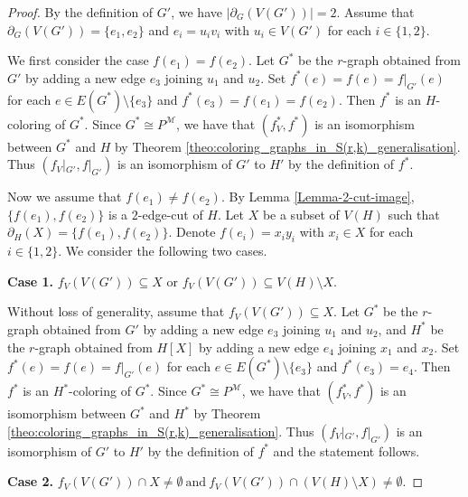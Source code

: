 \documentclass[a4paper,11pt]{article}
\newcommand{\ca}{\mathcal}
\theoremstyle{remark}
\begin{document}
\begin{proof}
	By the definition of $ G' $, we have $ | \partial_G(V(G')) |=2$. Assume that $\partial_G(V(G')) =\{e_1,e_2\}$ and $ e_i=u_iv_i $ with $ u_i\in V(G') $ for each $ i\in \{1,2\} $.
	
	We first consider the case $ f(e_1)=f(e_2) $. Let $ G^* $ be the $ r $-graph obtained from $ G' $ by adding a new edge $ e_3 $ joining $ u_1 $ and $ u_2 $. Set $ f^*(e)= f(e)=f|_{G'}(e) $ for each $ e\in E(G^*) \setminus \{e_3\}$ and $ f^*(e_3)= f(e_1)=f(e_2) $. Then $ f^* $ is an $ H $-coloring of $ G^* $. Since $ G^* \cong P^{\ca M}$, we have that $ (f^*_V,f^*) $ is an isomorphism between $ G^* $ and $ H$ by Theorem \ref{theo:coloring_graphs_in_S(r,k)_generalisation}. Thus $ (f_V|_{G'} , f|_{G'} ) $ is an isomorphism of $ G' $ to $ H' $ by the definition of $ f^* $.
	
	Now we assume that $ f(e_1)\neq f(e_2) $. By Lemma \ref{Lemma-2-cut-image}, $\{f(e_1), f(e_2) \}$  is a $ 2 $-edge-cut of $ H $. Let  $ X $ be a subset of $ V(H) $ such that $ \partial_H(X)=\{f(e_1), f(e_2) \}$. Denote $ f(e_i)=x_iy_i$ with $ x_i\in X $ for each $ i\in\{1,2\} $. We consider the following two cases.
	
	{\bf Case 1.} $f_V(V(G')) \subseteq X$ or $f_V(V(G'))\subseteq V(H)\setminus X$.
	
Without loss of generality, assume that  $f_V(V(G'))\subseteq X$. Let $ G^* $ be the $ r $-graph obtained from $ G' $ by adding a new edge $ e_3 $ joining $ u_1 $ and $ u_2 $, and  $ H^* $ be the $ r $-graph obtained from $ H[X] $ by adding a new edge $ e_4 $ joining $ x_1 $ and $ x_2 $. Set  $ f^*(e)= f(e)=f|_{G'}(e) $ for each $ e\in E(G^*) \setminus \{e_3\}$ and $ f^*(e_3)= e_4 $. Then $ f^* $ is an $ H^* $-coloring of $ G^* $. Since $ G^* \cong P^{\ca M}$, we have that $ (f^*_V,f^*) $ is an isomorphism between $ G^* $ and $ H^*$ by Theorem \ref{theo:coloring_graphs_in_S(r,k)_generalisation}. Thus $ (f_V|_{G'} , f|_{G'} ) $ is an isomorphism of $ G' $ to $ H' $ by the definition of $ f^* $ and the statement follows.

{\bf Case 2.} $f_V(V(G'))\cap X\neq \emptyset~\text{and}~f_V(V(G'))\cap (V(H)\setminus X)\neq \emptyset$.


\end{proof}
\end{document}
